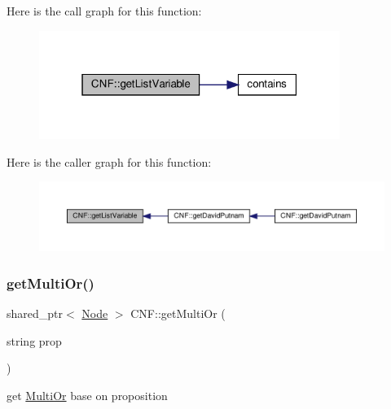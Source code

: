 Here is the call graph for this function\+:\nopagebreak
\begin{figure}[H]
\begin{center}
\leavevmode
\includegraphics[width=277pt]{dc/d0e/class_c_n_f_abb762bfe4bc7bbccda81f8db332bafe3_cgraph}
\end{center}
\end{figure}
Here is the caller graph for this function\+:\nopagebreak
\begin{figure}[H]
\begin{center}
\leavevmode
\includegraphics[width=350pt]{dc/d0e/class_c_n_f_abb762bfe4bc7bbccda81f8db332bafe3_icgraph}
\end{center}
\end{figure}
\mbox{\label{class_c_n_f_af2c396e921388daa2e99b6fef25b6697}} 
\subsubsection{\texorpdfstring{get\+Multi\+Or()}{getMultiOr()}}
{\footnotesize\ttfamily shared\+\_\+ptr$<$ \hyperlink{class_node}{Node} $>$ C\+N\+F\+::get\+Multi\+Or (\begin{DoxyParamCaption}\item[{string}]{prop }\end{DoxyParamCaption})\hspace{0.3cm}{\ttfamily [private]}}



get \hyperlink{class_multi_or}{Multi\+Or} base on proposition 



